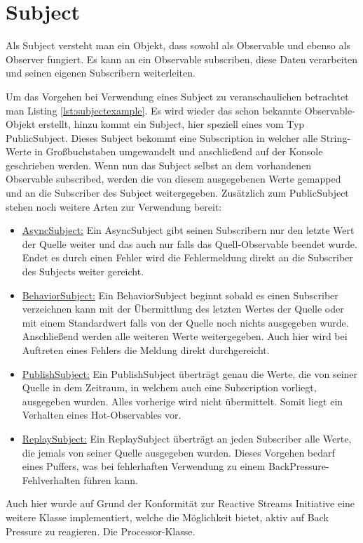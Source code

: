 \section{Subject}
Als Subject versteht man ein Objekt, dass sowohl als Observable und ebenso als Observer fungiert. Es kann an ein Observable subscriben, diese Daten verarbeiten und seinen eigenen Subscribern weiterleiten. 

Um das Vorgehen bei Verwendung eines Subject zu veranschaulichen betrachtet man Listing \ref{lst:subjectexample}. Es wird wieder das schon bekannte Observable-Objekt erstellt, hinzu kommt ein Subject, hier speziell eines vom Typ PublicSubject. Dieses Subject bekommt eine Subscription in welcher alle String-Werte in Großbuchstaben umgewandelt und anschließend auf der Konsole geschrieben werden. Wenn nun das Subject selbst an dem vorhandenen Observable subscribed, werden die von diesem ausgegebenen Werte gemapped und an die Subscriber des Subject weitergegeben. \newpage Zusätzlich zum PublicSubject stehen noch weitere Arten zur Verwendung bereit:
\begin{itemize}
	\item \underline{AsyncSubject:} Ein AsyncSubject gibt seinen Subscribern nur den letzte Wert der Quelle weiter und das auch nur falls das Quell-Observable beendet wurde. Endet es durch einen Fehler wird die Fehlermeldung direkt an die Subscriber des Subjects weiter gereicht.
	\item \underline{BehaviorSubject:} Ein BehaviorSubject beginnt sobald es einen Subscriber verzeichnen kann mit der Übermittlung des letzten Wertes der Quelle oder mit einem Standardwert falls von der Quelle noch nichts ausgegeben wurde. Anschließend werden alle weiteren Werte weitergegeben. Auch hier wird bei Auftreten eines Fehlers die Meldung direkt durchgereicht.
	\item \underline{PublishSubject:} Ein PublishSubject überträgt genau die Werte, die von seiner Quelle in dem Zeitraum, in welchem auch eine Subscription vorliegt, ausgegeben wurden. Alles vorherige wird nicht übermittelt. Somit liegt ein Verhalten eines Hot-Observables vor.
	\item \underline{ReplaySubject:} Ein ReplaySubject überträgt an jeden Subscriber alle Werte, die jemals von seiner Quelle ausgegeben wurden. Dieses Vorgehen bedarf eines Puffers, was bei fehlerhaften Verwendung zu einem BackPressure-Fehlverhalten führen kann. 
\end{itemize}
Auch hier wurde auf Grund der Konformität zur Reactive Streams Initiative eine weitere Klasse implementiert, welche die Möglichkeit bietet, aktiv auf Back Pressure zu reagieren. Die Processor-Klasse.
